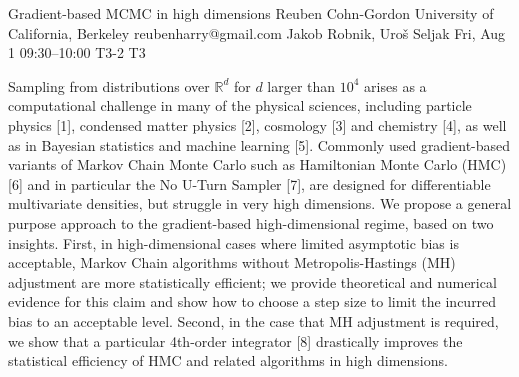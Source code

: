 \begin{talk}
  {Gradient-based MCMC in high dimensions}%
  {Reuben Cohn-Gordon}%
  {University of California, Berkeley}%
  {reubenharry@gmail.com}%
  {Jakob Robnik, Uro\v{s} Seljak}%
  {}%
  {Fri, Aug 1 09:30--10:00}%
  {T3-2}%
  {T3}%
  
    
   
Sampling from distributions over $\mathbb{R}^d$ for $d$ larger than $10^4$ arises as a computational challenge in many of the physical sciences, including particle physics [1], condensed matter physics [2], cosmology [3] and chemistry [4], as well as in Bayesian statistics and machine learning [5]. Commonly used gradient-based variants of Markov Chain Monte Carlo such as Hamiltonian Monte Carlo (HMC) [6] and in particular the No U-Turn Sampler [7], are designed for differentiable multivariate densities, but struggle in very high dimensions. 
We propose a general purpose approach to the gradient-based high-dimensional regime, based on two insights. First, in high-dimensional cases where limited asymptotic bias is acceptable, Markov Chain algorithms without Metropolis-Hastings (MH) adjustment are more statistically efficient; we provide theoretical and numerical evidence for this claim and show how to choose a step size to limit the incurred bias to an acceptable level. Second, in the case that MH adjustment is required, we show that a particular 4th-order integrator [8] drastically improves the statistical efficiency of HMC and related algorithms in high dimensions.


\medskip


\end{talk}
